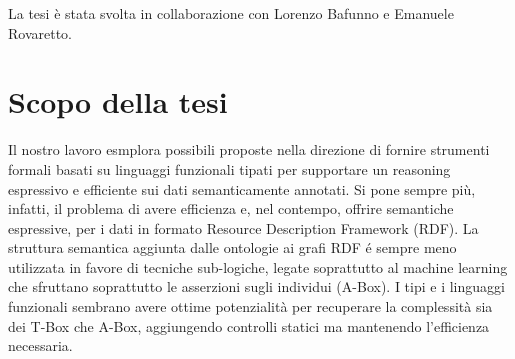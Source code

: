 La tesi è stata svolta in collaborazione con Lorenzo Bafunno e Emanuele Rovaretto.


\section{Scopo della tesi}
Il nostro lavoro esmplora possibili proposte nella direzione di fornire strumenti formali basati su linguaggi funzionali tipati per supportare un reasoning
espressivo e efficiente sui dati semanticamente annotati. Si pone sempre più, infatti, il problema di avere efficienza e, nel contempo, offrire semantiche 
espressive, per i dati in formato Resource Description Framework (RDF). La struttura semantica aggiunta dalle ontologie ai grafi RDF \'e sempre meno utilizzata
in favore di tecniche sub-logiche, legate soprattutto al machine learning che sfruttano soprattutto le asserzioni sugli individui (A-Box). 
I tipi e i linguaggi funzionali sembrano avere ottime potenzialità per recuperare la complessità sia dei T-Box che A-Box, aggiungendo controlli statici
ma mantenendo l'efficienza necessaria.
